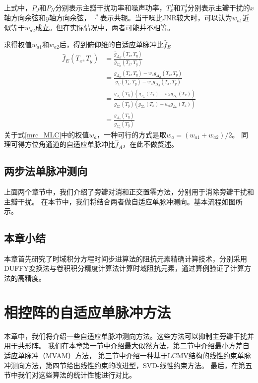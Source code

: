 \documentclass[master]{thesis-uestc}
\begin{document}
上式中，$P_J$和$P_N$分别表示主瓣干扰功率和噪声功率，$T_x^J$和$T_y^J$分别表示主瓣干扰的$x$轴方向余弦和$y$轴方向余弦，
$\cdot^*$表示共轭。当干噪比JNR较大时，可以认为$w_{a1}$近似等于$w_{a2}$成立。但在实际情况中，两者可能并不相等。

求得权值$w_{a1}$和$w_{a2}$后，得到俯仰维的自适应单脉冲比$\hat{f}_E$
\begin{equation}\label{mrc_MLC}
    \begin{aligned}
        \hat{f}_{E}\left(T_{x}, T_{y}\right) &=\frac{\hat{g}_{\Delta_{E}}\left(T_{x}, T_{y}\right)}{\hat{g}_{\Sigma_{E}}\left(T_{x}, T_{y}\right)} \\
        &=\frac{g_{\Delta_{E}}\left(T_{x}, T_{y}\right)-w_{a} g_{\Delta_{\Delta}}\left(T_{x}, T_{y}\right)}{g_{\Sigma}\left(T_{x}, T_{y}\right)-w_{a} g_{\Delta_{A}}\left(T_{x}, T_{y}\right)} \\
        &=\frac{g_{\Delta_{e}}\left(T_{y}\right)\left(g_{\Sigma_{a}}\left(T_{x}\right)-w_{a} g_{\Delta_{a}}\left(T_{x}\right)\right)}{g_{\Sigma_{e}}\left(T_{y}\right)\left(g_{\Sigma_{a}}\left(T_{x}\right)-w_{a} g_{\Delta_{a}}\left(T_{x}\right)\right)} \\
        &=\frac{g_{\Delta_{e}}\left(T_{y}\right)}{g_{\Sigma_{e}}\left(T_{y}\right)}
        \end{aligned}
\end{equation}
关于式\eqref{mrc_MLC}中的权值$w_a$，一种可行的方式是取$w_a=(w_{a1}+w_{a2})/2$。
同理可得方位角通道的自适应单脉冲比$\hat{f}_A$，在此不做赘述。

\section{两步法单脉冲测向}
上面两个章节中，我们介绍了旁瓣对消和正交置零方法，分别用于消除旁瓣干扰和主瓣干扰。
在本节中，我们将结合两者做自适应单脉冲测向。基本流程如图所示。

\section{本章小结}
本章首先研究了时域积分方程时间步进算法的阻抗元素精确计算技术，分别采用DUFFY变换法与卷积积分精度计算法计算时域阻抗元素，通过算例验证了计算方法的高精度。

\chapter{相控阵的自适应单脉冲方法}
本章中，我们将介绍一些自适应单脉冲测向方法。这些方法可以抑制主旁瓣干扰并用于共形阵。
我们在本章第一节中介绍最大似然方法，第二节中介绍最小方差自适应单脉冲（MVAM）方法，
第三节中介绍一种基于LCMV结构的线性约束单脉冲测向方法，第四节给出线性约束的改进型，SVD-线性约束方法。
最后，在第五节中我们对这些算法的统计性能进行对比。
\end{document}
